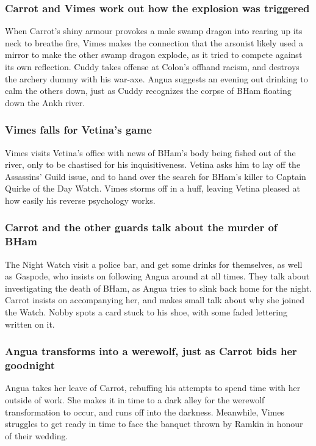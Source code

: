 \subsubsection{\Gls{Carrot} and \Gls{Vimes} work out how the explosion was triggered}
When \Gls{Carrot}'s shiny armour provokes a male swamp dragon into rearing up its neck to breathe
fire, \Gls{Vimes} makes the connection that the arsonist likely used a mirror to make the other
swamp dragon explode, as it tried to compete against its own reflection. \Gls{Cuddy} takes offense
at \Gls{Colon}'s offhand racism, and destroys the archery dummy with his war-axe. \Gls{Angua}
suggests an evening out drinking to calm the others down, just as \Gls{Cuddy} recognizes the corpse
of \Gls{BHam} floating down the Ankh river.

\subsubsection{\Gls{Vimes} falls for \Gls{Vetina}'s game}
\Gls{Vimes} visits \Gls{Vetina}'s office with news of \Gls{BHam}'s body being fished out of the
river, only to be chastised for his inquisitiveness. \Gls{Vetina} asks him to lay off the Assassins'
Guild issue, and to hand over the search for \Gls{BHam}'s killer to Captain \Gls{Quirke} of the
Day Watch. \Gls{Vimes} storms off in a huff, leaving \Gls{Vetina} pleased at how easily his
reverse psychology works.

\subsubsection{\Gls{Carrot} and the other guards talk about the murder of \Gls{BHam}}
The Night Watch visit a police bar, and get some drinks for themselves, as well as \Gls{Gaspode},
who insists on following \Gls{Angua} around at all times. They talk about investigating the death of
\Gls{BHam}, as \Gls{Angua} tries to slink back home for the night. \Gls{Carrot} insists on
accompanying her, and makes small talk about why she joined the Watch. \Gls{Nobby} spots a card
stuck to his shoe, with some faded lettering written on it.

\subsubsection{\Gls{Angua} transforms into a werewolf, just as \Gls{Carrot} bids her goodnight}
\Gls{Angua} takes her leave of \Gls{Carrot}, rebuffing his attempts to spend time with her outside
of work. She makes it in time to a dark alley for the werewolf transformation to occur, and runs off
into the darkness. Meanwhile, \Gls{Vimes} struggles to get ready in time to face the banquet thrown
by \Gls{Ramkin} in honour of their wedding.

